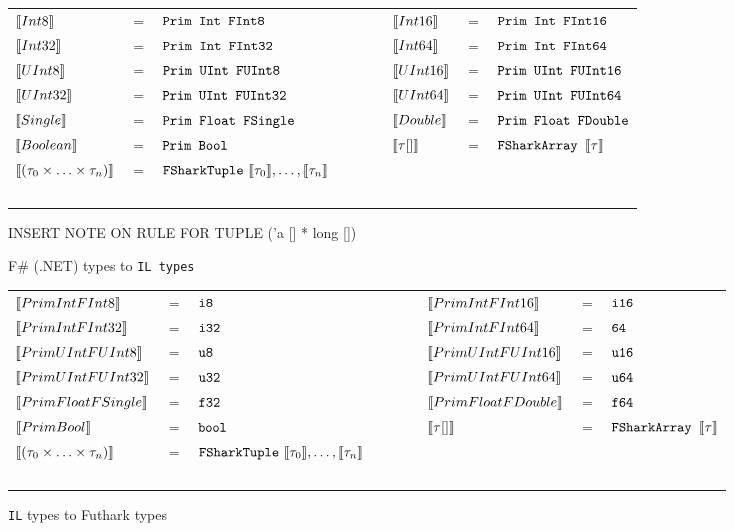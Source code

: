 \begin{figure}
  \centering
\begin{tabular}{@{}l c l c l c l}%
  $\llbracket Int8 \rrbracket$ & $=$ & $\text{\ttfamily Prim Int FInt8} $ & ~~~~~ & 
  $\llbracket Int16 \rrbracket$ & $=$ & $\text{\ttfamily Prim Int FInt16}$
  \\
  $\llbracket Int32 \rrbracket$ & $=$ & $\text{\ttfamily Prim Int FInt32} $ & ~~~~~ & 
  $\llbracket Int64 \rrbracket$ & $=$ & $\text{\ttfamily Prim Int FInt64} $
  \\
  $\llbracket UInt8 \rrbracket$ & $=$ & $\text{\ttfamily Prim UInt FUInt8} $ & ~~~~~ & 
  $\llbracket UInt16 \rrbracket$ & $=$ & $\text{\ttfamily Prim UInt FUInt16} $ 
  \\
  $\llbracket UInt32 \rrbracket$ & $=$ & $\text{\ttfamily Prim UInt FUInt32} $ & ~~~~~ & 
  $\llbracket UInt64 \rrbracket$ & $=$ & $\text{\ttfamily Prim UInt FUInt64} $ 
  \\
  $\llbracket Single \rrbracket$ & $=$ & $\text{\ttfamily Prim Float FSingle} $ & ~~~~~ & 
  $\llbracket Double \rrbracket$ & $=$ & $\text{\ttfamily Prim Float FDouble} $ 
  \\
  $\llbracket Boolean \rrbracket$ & $=$ & $\text{\ttfamily Prim Bool} $ & ~~~~~ & 
  $\llbracket \tau [] \rrbracket$ & $=$ & $\text{\ttfamily \texttt{FShark}{}Array }\llbracket \tau \rrbracket$
  \\
  $\llbracket (\tau_0 \times \ldots \times \tau_n) \rrbracket$ & $=$ & $\text{\ttfamily \texttt{FShark}{}Tuple}~\llbracket \tau_0 \rrbracket,\ldots,\llbracket \tau_n \rrbracket$ \\ ~ \\
\end{tabular}

INSERT NOTE ON RULE FOR TUPLE ('a [] * long [])

\caption{F\# (.NET) types to \texttt{\fshark{}IL types}}
\end{figure}

\begin{figure}
  \centering
\begin{tabular}{@{}l c l c l c l}%
  $\llbracket Prim Int FInt8 \rrbracket$ & $=$ & $\text{\ttfamily i8} $ & ~~~~~ & 
  $\llbracket Prim Int FInt16 \rrbracket$ & $=$ & $\text{\ttfamily i16}$
  \\
  $\llbracket Prim Int FInt32 \rrbracket$ & $=$ & $\text{\ttfamily i32} $ & ~~~~~ & 
  $\llbracket Prim Int FInt64 \rrbracket$ & $=$ & $\text{\ttfamily 64} $
  \\
  $\llbracket Prim UInt FUInt8 \rrbracket$ & $=$ & $\text{\ttfamily u8} $ & ~~~~~ & 
  $\llbracket Prim UInt FUInt16 \rrbracket$ & $=$ & $\text{\ttfamily u16} $ 
  \\
  $\llbracket Prim UInt FUInt32 \rrbracket$ & $=$ & $\text{\ttfamily u32} $ & ~~~~~ & 
  $\llbracket Prim UInt FUInt64 \rrbracket$ & $=$ & $\text{\ttfamily u64} $ 
  \\
  $\llbracket Prim Float FSingle \rrbracket$ & $=$ & $\text{\ttfamily f32} $ & ~~~~~ & 
  $\llbracket Prim Float FDouble \rrbracket$ & $=$ & $\text{\ttfamily f64} $ 
  \\
  $\llbracket Prim Bool \rrbracket$ & $=$ & $\text{\ttfamily bool} $ & ~~~~~ & 
  $\llbracket \tau [] \rrbracket$ & $=$ & $\text{\ttfamily \texttt{FShark}{}Array }\llbracket \tau \rrbracket$
  \\
  $\llbracket (\tau_0 \times \ldots \times \tau_n) \rrbracket$ & $=$ & $\text{\ttfamily \texttt{FShark}{}Tuple}~\llbracket \tau_0 \rrbracket,\ldots,\llbracket \tau_n \rrbracket$ \\ ~ \\
\end{tabular}
\caption{\texttt{\fshark{}IL} types to Futhark types}
\end{figure}

